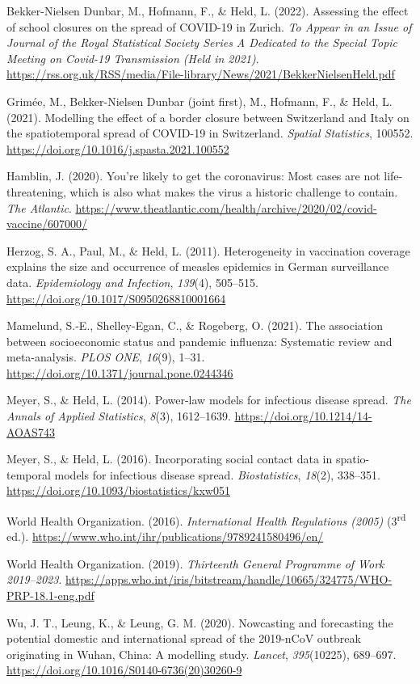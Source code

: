 \documentclass[authordate, rga]{jote-new-article}
\begin{document}
Bekker-Nielsen Dunbar, M., Hofmann, F., \& Held, L. (2022). Assessing the effect of school closures on the spread of COVID-19 in Zurich. \emph{To Appear in an Issue of Journal of the Royal Statistical Society Series A Dedicated to the Special Topic Meeting on Covid-19 Transmission (Held in 2021)}. \url{https://rss.org.uk/RSS/media/File-library/News/2021/BekkerNielsenHeld.pdf}


Grimée, M., Bekker-Nielsen Dunbar (joint first), M., Hofmann, F., \& Held, L. (2021). Modelling the effect of a border closure between Switzerland and Italy on the spatiotemporal spread of COVID-19 in Switzerland. \emph{Spatial Statistics}, 100552. \url{https://doi.org/10.1016/j.spasta.2021.100552}


Hamblin, J. (2020). You're likely to get the coronavirus: Most cases are not life-threatening, which is also what makes the virus a historic challenge to contain. \emph{The Atlantic}. \url{https://www.theatlantic.com/health/archive/2020/02/covid-vaccine/607000/}


Herzog, S. A., Paul, M., \& Held, L. (2011). Heterogeneity in vaccination coverage explains the size and occurrence of measles epidemics in German surveillance data. \emph{Epidemiology and Infection}, \emph{139}(4), 505--515. \url{https://doi.org/10.1017/S0950268810001664}


Mamelund, S.-E., Shelley-Egan, C., \& Rogeberg, O. (2021). The association between socioeconomic status and pandemic influenza: Systematic review and meta-analysis. \emph{PLOS ONE}, \emph{16}(9), 1--31. \url{https://doi.org/10.1371/journal.pone.0244346}


Meyer, S., \& Held, L. (2014). Power-law models for infectious disease spread. \emph{The Annals of Applied Statistics}, \emph{8}(3), 1612--1639. \url{https://doi.org/10.1214/14-AOAS743}


Meyer, S., \& Held, L. (2016). Incorporating social contact data in spatio-temporal models for infectious disease spread. \emph{Biostatistics}, \emph{18}(2), 338--351. \url{https://doi.org/10.1093/biostatistics/kxw051}


World Health Organization. (2016). \emph{International Health Regulations (2005) }(3\textsuperscript{rd} ed.). \url{https://www.who.int/ihr/publications/9789241580496/en/}


World Health Organization. (2019). \emph{Thirteenth General Programme of Work 2019--2023}. \url{https://apps.who.int/iris/bitstream/handle/10665/324775/WHO-PRP-18.1-eng.pdf}


Wu, J. T., Leung, K., \& Leung, G. M. (2020). Nowcasting and forecasting the potential domestic and international spread of the 2019-nCoV outbreak originating in Wuhan, China: A modelling study. \emph{Lancet}, \emph{395}(10225), 689--697. \url{https://doi.org/10.1016/S0140-6736(20)30260-9}
\end{document}
